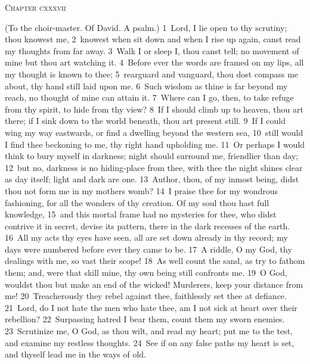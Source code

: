 \documentclass[10pt]{book} %
\begin{document}
\begin{large}\begin{center}\textsc{Chapter cxxxvii}\end{center}\end{large}
(To the choir-master. Of David. A psalm.)
\textcolor{benred8}{1}~Lord, I lie open to thy scrutiny; thou knowest me, \textcolor{benred8}{2}~knowest when sit down and when I rise up again, canst read my thoughts from far away. \textcolor{benred8}{3}~Walk I or sleep I, thou canst tell; no movement of mine but thou art watching it. \textcolor{benred8}{4}~Before ever the words are framed on my lips, all my thought is known to thee; \textcolor{benred8}{5}~rearguard and vanguard, thou dost compass me about, thy hand still laid upon me. \textcolor{benred8}{6}~Such wisdom as thine is far beyond my reach, no thought of mine can attain it.
\textcolor{benred8}{7}~Where can I go, then, to take refuge from thy spirit, to hide from thy view? \textcolor{benred8}{8}~If I should climb up to heaven, thou art there; if I sink down to the world beneath, thou art present still. \textcolor{benred8}{9}~If I could wing my way eastwards, or find a dwelling beyond the western sea, \textcolor{benred8}{10}~still would I find thee beckoning to me, thy right hand upholding me. \textcolor{benred8}{11}~Or perhaps I would think to bury myself in darkness; night should surround me, friendlier than day; \textcolor{benred8}{12}~but no, darkness is no hiding-place from thee, with thee the night shines clear as day itself; light and dark are one.
\textcolor{benred8}{13}~Author, thou, of my inmost being, didst thou not form me in my mother\textquotesingle s womb? \textcolor{benred8}{14}~I praise thee for my wondrous fashioning, for all the wonders of thy creation. Of my soul thou hast full knowledge, \textcolor{benred8}{15}~and this mortal frame had no mysteries for thee, who didst contrive it in secret, devise its pattern, there in the dark recesses of the earth. \textcolor{benred8}{16}~All my acts thy eyes have seen, all are set down already in thy record; my days were numbered before ever they came to be.
\textcolor{benred8}{17}~A riddle, O my God, thy dealings with me, so vast their scope! \textcolor{benred8}{18}~As well count the sand, as try to fathom them; and, were that skill mine, thy own being still confronts me. \textcolor{benred8}{19}~O God, wouldst thou but make an end of the wicked! Murderers, keep your distance from me! \textcolor{benred8}{20}~Treacherously they rebel against thee, faithlessly set thee at defiance. \textcolor{benred8}{21}~Lord, do I not hate the men who hate thee, am I not sick at heart over their rebellion? \textcolor{benred8}{22}~Surpassing hatred I bear them, count them my sworn enemies. \textcolor{benred8}{23}~Scrutinize me, O God, as thou wilt, and read my heart; put me to the test, and examine my restless thoughts. \textcolor{benred8}{24}~See if on any false paths my heart is set, and thyself lead me in the ways of old.
\end{document}
